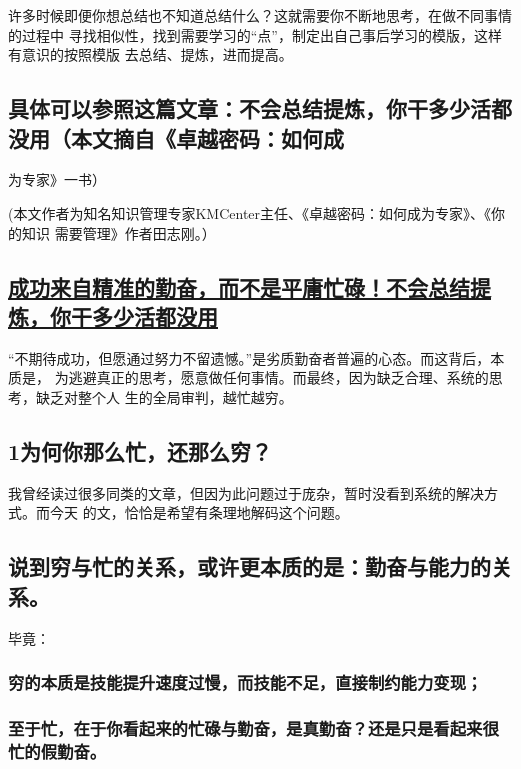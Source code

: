 \documentclass[11pt]{ctexart}
\begin{document}
{{{{许多时候即便你想总结也不知道总结什么？这就需要你不断地思考，在做不同事情的过程中
寻找相似性，找到需要学习的“点”，制定出自己事后学习的模版，这样有意识的按照模版
去总结、提炼，进而提高。
\subsection{具体可以参照这篇文章：不会总结提炼，你干多少活都没用（本文摘自《卓越密码：如何成}
\label{sec:orgbc6b737}
为专家》一书）

(本文作者为知名知识管理专家KMCenter主任、《卓越密码：如何成为专家》、《你的知识
需要管理》作者田志刚。）

\subsection{\href{http://baijiahao.baidu.com/s?id=1577752836880338007\&wfr=spider\&for=pc}{成功来自精准的勤奋，而不是平庸忙碌！不会总结提炼，你干多少活都没用}}
\label{sec:orgd516f5e}

“不期待成功，但愿通过努力不留遗憾。”是劣质勤奋者普遍的心态。而这背后，本质是，
为逃避真正的思考，愿意做任何事情。而最终，因为缺乏合理、系统的思考，缺乏对整个人
生的全局审判，越忙越穷。

\subsection{1为何你那么忙，还那么穷？}
\label{sec:org33f89ea}

我曾经读过很多同类的文章，但因为此问题过于庞杂，暂时没看到系统的解决方式。而今天
的文，恰恰是希望有条理地解码这个问题。

\subsection{说到穷与忙的关系，或许更本质的是：勤奋与能力的关系。}
\label{sec:org286e63b}
毕竟：

\subsubsection{穷的本质是技能提升速度过慢，而技能不足，直接制约能力变现；}
\label{sec:org725245d}

\subsubsection{至于忙，在于你看起来的忙碌与勤奋，是真勤奋？还是只是看起来很忙的假勤奋。}
\label{sec:orgbb30c92}

}}}}
\end{document}
